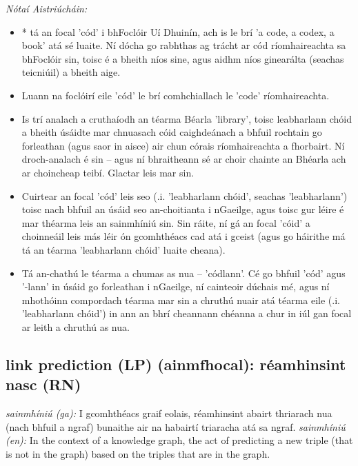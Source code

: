 \documentclass{article}
\begin{document}
 \noindent \textit{Nótaí Aistriúcháin:}
\begin{itemize}
	\item * tá an focal 'cód' i bhFoclóir Uí Dhuinín, ach is le brí 'a code, a codex, a book' atá sé luaite. Ní dócha go rabhthas ag trácht ar cód ríomhaireachta sa bhFoclóir sin, toisc é a bheith níos sine, agus aidhm níos ginearálta (seachas teicniúil) a bheith aige.
	\item Luann na foclóirí eile 'cód' le brí comhchiallach le 'code' ríomhaireachta.
	\item Is trí analach a cruthaíodh an téarma Béarla 'library', toisc leabharlann chóid a bheith úsáidte mar chnuasach cóid caighdeánach a bhfuil rochtain go forleathan (agus saor in aisce) air chun córais ríomhaireachta a fhorbairt. Ní droch-analach é sin -- agus ní bhraitheann sé ar choir chainte an Bhéarla ach ar choincheap teibí. Glactar leis mar sin.
	\item Cuirtear an focal 'cód' leis seo (.i. 'leabharlann chóid', seachas 'leabharlann') toisc nach bhfuil an úsáid seo an-choitianta i nGaeilge, agus toisc gur léire é mar théarma leis an sainmhíniú sin. Sin ráite, ní gá an focal 'cóid' a choinneáil leis más léir ón gcomhthéacs cad atá i gceist (agus go háirithe má tá an téarma 'leabharlann chóid' luaite cheana).
	\item Tá an-chathú le téarma a chumas as nua -- 'códlann'. Cé go bhfuil 'cód' agus '-lann' in úsáid go forleathan i nGaeilge, ní cainteoir dúchais mé, agus ní mhothóinn compordach téarma mar sin a chruthú nuair atá téarma eile (.i. 'leabharlann chóid') in ann an bhrí cheannann chéanna a chur in iúl gan focal ar leith a chruthú as nua.
\end{itemize}


\subsection*{link prediction (LP) (ainmfhocal): réamhinsint nasc (RN)} 
 \noindent \textit{sainmhíniú (ga):} I gcomhthéacs graif eolais, réamhinsint abairt thriarach nua (nach bhfuil a ngraf) bunaithe air na habairtí triaracha atá sa ngraf.
\newline\newline
 \noindent \textit{sainmhíniú (en):} In the context of a knowledge graph, the act of predicting a new triple (that is not in the graph) based on the triples that are in the graph.
\newline
\end{document}
